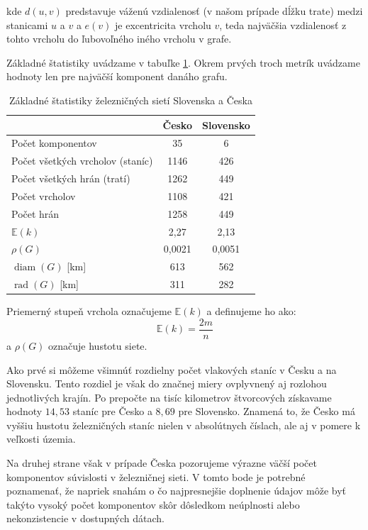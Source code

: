 \documentclass[main.tex]{subfiles}
\begin{document}
\noindent
kde $d(u, v)$ predstavuje váženú vzdialenosť (v našom prípade dĺžku trate) medzi stanicami $u$ a $v$ a $e(v)$ je excentricita vrcholu $v$, teda najväčšia vzdialenosť z tohto vrcholu do ľubovoľného iného vrcholu v grafe.

Základné štatistiky uvádzame v tabuľke \ref{tab:statistics}. Okrem prvých troch metrík uvádzame hodnoty len pre najväčší komponent danáho grafu.

\begin{table}[h!]
\centering
\begin{tabular}{@{}lcc@{}}
\toprule
 & Česko & Slovensko \\
\midrule
Počet komponentov & 35 & 6 \\
Počet všetkých vrcholov (staníc) & 1146 & 426 \\
Počet všetkých hrán (tratí) & 1262 & 449 \\
Počet vrcholov & 1108 & 421 \\
Počet hrán & 1258 & 449 \\
$\mathbb{E}(k)$ & 2{,}27 & 2{,}13 \\
$\rho(G)$ & 0{,}0021 & 0{,}0051 \\
$\operatorname{diam}(G)$ [km] & 613 & 562 \\
$\operatorname{rad}(G)$ [km] & 311 & 282 \\
\bottomrule
\end{tabular}
\caption{Základné štatistiky železničných sietí Slovenska a Česka}
\label{tab:statistics}
\end{table}
Priemerný stupeň vrchola označujeme $\mathbb{E}(k)$ a definujeme ho ako:
\begin{equation*}
    \mathbb{E}(k) = \frac{2m}{n}
\end{equation*}
a $\rho(G)$ označuje hustotu siete.

Ako prvé si môžeme všimnúť rozdielny počet vlakových staníc v Česku a na Slovensku. Tento rozdiel je však do značnej miery ovplyvnený aj rozlohou jednotlivých krajín. Po prepočte na tisíc kilometrov štvorcových získavame hodnoty $14{,}53$ staníc pre Česko a $8{,}69$ pre Slovensko. Znamená to, že Česko má vyššiu hustotu železničných staníc nielen v absolútnych číslach, ale aj v pomere k veľkosti územia.

Na druhej strane však v prípade Česka pozorujeme výrazne väčší počet komponentov súvislosti v železničnej sieti. V tomto bode je potrebné poznamenať, že napriek snahám o čo najpresnejšie doplnenie údajov môže byť takýto vysoký počet komponentov skôr dôsledkom neúplnosti alebo nekonzistencie v dostupných dátach.
\end{document}

